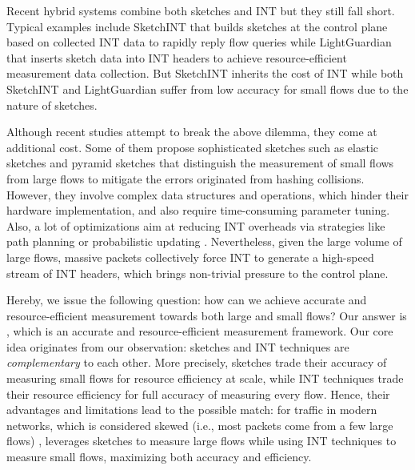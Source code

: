 Recent hybrid systems combine both sketches and INT \cite{yang2023sketchint,zhao2021lightguardian} but they still fall short. Typical examples include SketchINT \cite{yang2023sketchint} that builds sketches at the control plane based on collected INT data to rapidly reply flow queries while LightGuardian \cite{zhao2021lightguardian} that inserts sketch data into INT headers to achieve resource-efficient measurement data collection. But SketchINT inherits the cost of INT while both SketchINT and LightGuardian suffer from low accuracy for small flows due to the nature of sketches. 


Although recent studies attempt to break the above dilemma, they come at additional cost. Some of them propose sophisticated sketches such as elastic sketches \cite{yang2018elastic} and pyramid sketches \cite{yang2017pyramid} that distinguish the measurement of small flows from large flows to mitigate the errors originated from hashing collisions. However, they involve complex data structures and operations, which hinder their hardware implementation, and also require time-consuming parameter tuning. Also, a lot of optimizations aim at reducing INT overheads via strategies like path planning \cite{pan2019int} or probabilistic updating \cite{ben2020pint}. Nevertheless, given the large volume of large flows, massive packets collectively force INT to generate a high-speed stream of INT headers, which brings non-trivial pressure to the control plane. 

Hereby, we issue the following question: how can we achieve accurate and resource-efficient measurement towards both large and small flows? Our answer is \sysname, which is an accurate and resource-efficient measurement framework. Our core idea originates from our observation: sketches and INT techniques are \emph{complementary} to each other. More precisely, sketches trade their accuracy of measuring small flows for resource efficiency at scale, while INT techniques trade their resource efficiency for full accuracy of measuring every flow. Hence, their advantages and limitations lead to the possible match: for traffic in modern networks, which is considered skewed (i.e., most packets come from a few large flows) \cite{roy2015inside,huang2021toward,caida,benson2010network,yang2018elastic}, \sysname leverages sketches to measure large flows while using INT techniques to measure small flows, maximizing both accuracy and efficiency.

